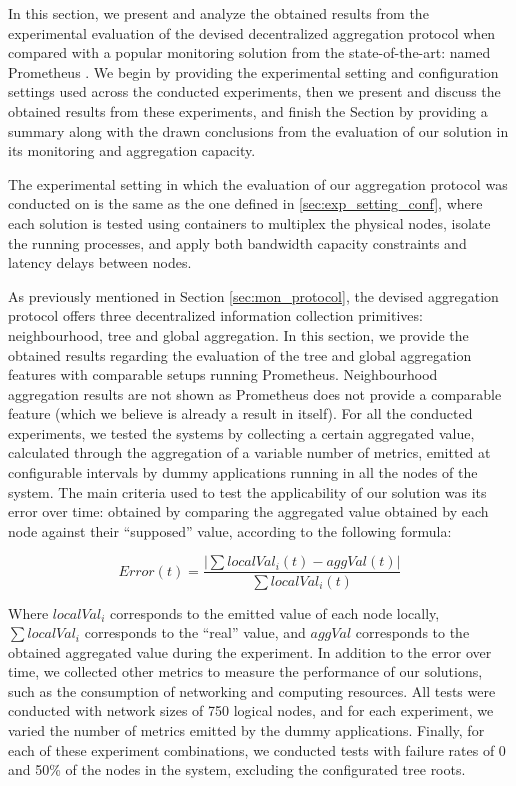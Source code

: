 

In this section, we present and analyze the obtained results from the experimental evaluation of the devised decentralized aggregation protocol when compared with a popular monitoring solution from the state-of-the-art: named Prometheus \cite{prometheus}. We begin by providing the experimental setting and configuration settings used across the conducted experiments, then we present and discuss the obtained results from these experiments, and finish the Section by providing a summary along with the drawn conclusions from the evaluation of our solution in its monitoring and aggregation capacity.

The experimental setting in which the evaluation of our aggregation protocol was conducted on is the same as the one defined in \ref{sec:exp_setting_conf}, where each solution is tested using containers to multiplex the physical nodes, isolate the running processes, and apply both bandwidth capacity constraints and latency delays between nodes.

As previously mentioned in Section \ref{sec:mon_protocol}, the devised aggregation protocol offers three decentralized information collection primitives: neighbourhood, tree and global aggregation. In this section, we provide the obtained results regarding the evaluation of the tree and global aggregation features with comparable setups running Prometheus. Neighbourhood aggregation results are not shown as Prometheus does not provide a comparable feature (which we believe is already a result in itself). For all the conducted experiments, we tested the systems by collecting a certain aggregated value, calculated through the aggregation of a variable number of metrics, emitted at configurable intervals by dummy applications running in all the nodes of the system. The main criteria used to test the applicability of our solution was its error over time: obtained by comparing the aggregated value obtained by each node against their ``supposed'' value, according to the following formula: 

\[ Error(t) =  \frac{|\sum localVal_i(t) - aggVal(t)|}{\sum localVal_i(t)}\]

Where $localVal_i$ corresponds to the emitted value of each node locally, $\sum localVal_i$ corresponds to the ``real'' value, and $aggVal$ corresponds to the obtained aggregated value during the experiment. In addition to the error over time, we collected other metrics to measure the performance of our solutions, such as the consumption of networking and computing resources. All tests were conducted with network sizes of 750 logical nodes, and for each experiment, we varied the number of metrics emitted by the dummy applications. Finally, for each of these experiment combinations, we conducted tests with failure rates of 0 and 50\% of the nodes in the system, excluding the configurated tree roots.


